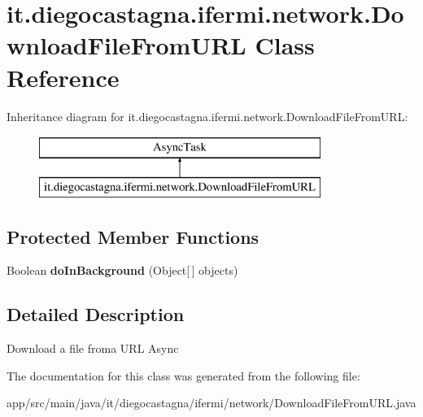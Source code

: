 \hypertarget{classit_1_1diegocastagna_1_1ifermi_1_1network_1_1_download_file_from_u_r_l}{}\section{it.\+diegocastagna.\+ifermi.\+network.\+Download\+File\+From\+U\+RL Class Reference}
\label{classit_1_1diegocastagna_1_1ifermi_1_1network_1_1_download_file_from_u_r_l}
Inheritance diagram for it.\+diegocastagna.\+ifermi.\+network.\+Download\+File\+From\+U\+RL\+:\begin{figure}[H]
\begin{center}
\leavevmode
\includegraphics[height=2.000000cm]{classit_1_1diegocastagna_1_1ifermi_1_1network_1_1_download_file_from_u_r_l}
\end{center}
\end{figure}
\subsection*{Protected Member Functions}
\begin{DoxyCompactItemize}
\item 
\mbox{\label{classit_1_1diegocastagna_1_1ifermi_1_1network_1_1_download_file_from_u_r_l_af4577ce4e5635e8aa262cc893e1fc187}} 
Boolean {\bfseries do\+In\+Background} (Object\mbox{[}$\,$\mbox{]} objects)
\end{DoxyCompactItemize}


\subsection{Detailed Description}
Download a file froma U\+RL Async 

The documentation for this class was generated from the following file\+:\begin{DoxyCompactItemize}
\item 
app/src/main/java/it/diegocastagna/ifermi/network/Download\+File\+From\+U\+R\+L.\+java\end{DoxyCompactItemize}
